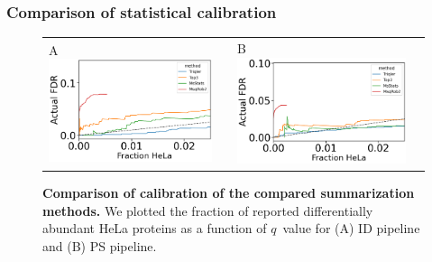 \documentclass[11pt]{article}
\begin{document}
\subsubsection*{Comparison of statistical calibration}
\begin{figure}[hbt]
    \centering
    \centering
    \begin{tabular}{lclc} 
        A \includegraphics[width=0.5\linewidth]{../../result/report_plots_pipeline/calibration_ID_0.48.png} & &%
        B \includegraphics[width=0.5\linewidth]{../../result/report_plots_pipeline/calibration_PS_0.48.png} & \\%
    \end{tabular}
  \caption{{\bf Comparison of calibration of the compared summarization methods.} We plotted the fraction of reported differentially abundant HeLa proteins as a function of $q$~value for (A) ID pipeline and (B) PS pipeline. \label{fig:frac_hela_vs_fdr}}
\end{figure}
\fi
\end{document}
